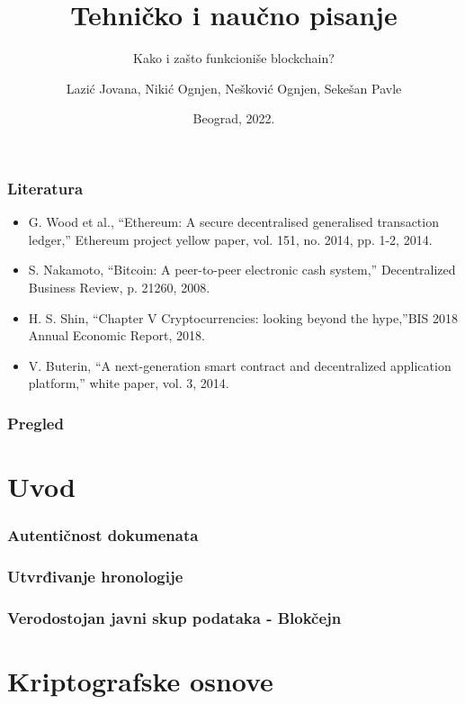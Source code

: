 \documentclass{beamer}
\title{Tehničko i naučno pisanje}
\subtitle{Kako i zašto funkcioniše blockchain?}
\author{Lazić Jovana, Nikić Ognjen, Nešković Ognjen, Sekešan Pavle}
\institute{Matematički fakultet\\Univerzitet u Beogradu}
\date{
	\footnotesize{Beograd, 2022.}	
}
\begin{document}
\begin{frame}
	\thispagestyle{empty}
	\titlepage
\end{frame}

\addtocounter{framenumber}{-1}

\begin{frame}[fragile]\frametitle{Literatura}
	\begin{itemize}
		\item G. Wood et al., “Ethereum: A secure decentralised generalised transaction ledger,” Ethereum project yellow paper, vol. 151, no. 2014, pp. 1-2, 2014.
		\item S. Nakamoto, “Bitcoin: A peer-to-peer electronic cash system,” Decentralized Business Review, p. 21260, 2008.
		\item H. S. Shin, “Chapter V Cryptocurrencies: looking beyond the hype,”BIS 2018 Annual Economic Report, 2018.
		\item V. Buterin, “A next-generation smart contract and decentralized application platform,” white paper, vol. 3, 2014.
	\end{itemize}
\end{frame}

\begin{frame}
	\frametitle{Pregled} %
	\tableofcontents[hidesubsections] 
\end{frame}

\section{Uvod}

\begin{frame}[fragile]\frametitle{Autentičnost dokumenata}
	
\end{frame}

\begin{frame}[fragile]\frametitle{Utvrđivanje hronologije}
	
\end{frame}

\begin{frame}[fragile]\frametitle{Verodostojan javni skup podataka - Blokčejn}
	
\end{frame}


\section{Kriptografske osnove}
\end{document}
